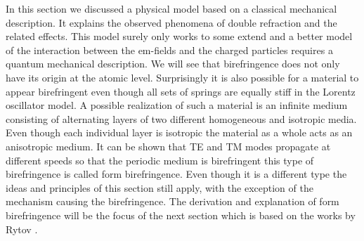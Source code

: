 In this section we discussed a physical model based on a classical mechanical description. It explains the observed phenomena of double refraction and the related effects. This model surely only works to some extend and a better model of the interaction between the em-fields and the charged particles requires a quantum mechanical description. We will see that birefringence does not only have its origin at the atomic level. Surprisingly it is also possible for a material to appear birefringent even though all sets of springs are equally stiff in the Lorentz oscillator model. A possible realization of such a material is an infinite medium consisting of alternating layers of two different homogeneous and isotropic media. Even though each individual layer is isotropic the material as a whole acts as an anisotropic medium. It can be shown that TE and TM modes propagate at different speeds so that the periodic medium is birefringent this type of birefringence is called form birefringence. Even though it is a different type the ideas and principles of this section still apply, with the exception of the mechanism causing the birefringence. The derivation and explanation of form birefringence will be the focus of the next section which is based on the works by Rytov \cite{Rytov1956ElectromagneticMedium}. 

